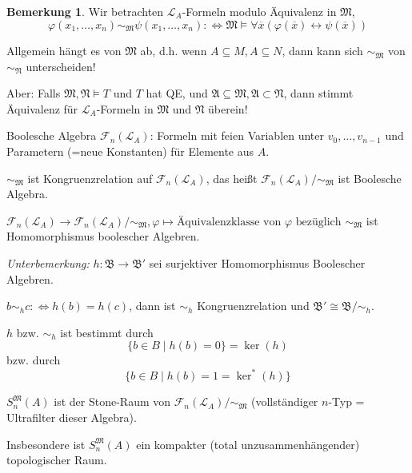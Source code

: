 \documentclass[12pt,parskip=full]{scrartcl}
\theoremstyle{definition}
\newtheorem{remark}[theorem]{Bemerkung}
\begin{document}
 	\begin{remark}
 		Wir betrachten $\mathcal{L}_A$-Formeln modulo Äquivalenz in $\mathfrak{M}$,
 		\begin{equation*}
			\varphi(x_1, \dots, x_n) \sim_\mathfrak{M} \psi(x_1, \dots, x_n) :\Leftrightarrow \mathfrak{M} \models \forall \overline{x}(\varphi(\overline{x}) \leftrightarrow \psi(\overline{x}))
 		\end{equation*}
 		
 		Allgemein hängt es von $\mathfrak{M}$ ab, d.h. wenn $A \subseteq M, A \subseteq N$, dann kann sich $\sim_\mathfrak{M}$ von $\sim_\mathfrak{N}$ unterscheiden!
 		
 		Aber: Falls $\mathfrak{M}, \mathfrak{N} \models T$ und $T$ hat QE, und $\mathfrak{A} \subseteq \mathfrak{M}, \mathfrak{A} \subset \mathfrak{N}$, dann stimmt Äquivalenz für $\mathcal{L}_A$-Formeln in $\mathfrak{M}$ und $\mathfrak{N}$ überein!
 		
 		Boolesche Algebra $\mathcal{F}_n(\mathcal{L}_A)$: Formeln mit feien Variablen unter $v_0, \dots, v_{n-1}$ und Parametern (=neue Konstanten) für Elemente aus $A$.
 		
 		$\sim_\mathfrak{M}$ ist Kongruenzrelation auf $\mathcal{F}_n(\mathcal{L}_A)$, das heißt $\mathcal{F}_n(\mathcal{L}_A)/\sim_\mathfrak{M}$ ist Boolesche Algebra.
 		
 		$\mathcal{F}_n(\mathcal{L}_A) \to \mathcal{F}_n(\mathcal{L}_A)/\sim_\mathfrak{M}, \varphi \mapsto \text{Äquivalenzklasse von $\varphi$ bezüglich $\sim_\mathfrak{M}$}$ ist Homomorphismus boolescher Algebren.
 		
 		\textit{Unterbemerkung:} $h: \mathfrak{B} \to \mathfrak{B}'$ sei surjektiver Homomorphismus Boolescher Algebren.
 		
 		$b \sim_h c :\Leftrightarrow h(b) = h(c)$, dann ist $\sim_h$ Kongruenzrelation und $\mathfrak{B}' \cong \mathfrak{B}/\sim_h$.
 		
 		$h$ bzw. $\sim_h$ ist bestimmt durch
 		\begin{equation*}
	 		\{ b \in B \mid h(b) = 0 \} = \ker(h)
 		\end{equation*}
 		bzw. durch
 		\begin{equation*}
	 		\{ b \in B \mid h(b) = 1 = \ker^*(h) \}
 		\end{equation*}
 		
 		$S_n^\mathfrak{M}(A)$ ist der Stone-Raum von $\mathcal{F}_n(\mathcal{L}_A)/\sim_\mathfrak{M}$ (vollständiger $n$-Typ = Ultrafilter dieser Algebra).
 		
 		Insbesondere ist $S_n^\mathfrak{M}(A)$ ein kompakter (total unzusammenhängender) topologischer Raum.
 	\end{remark}
 
\end{document}
